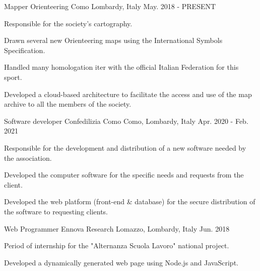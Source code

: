 

\begin{cventries}

  \cventry
  {Mapper} %
  {Orienteering Como} %
  {Lombardy, Italy} %
  {May. 2018 - PRESENT} %
  {
    \begin{cvitems} %
      \item {Responsible for the society's cartography.}
      \item {Drawn several new Orienteering maps using the International Symbols Specification.}
      \item {Handled many homologation iter with the official Italian Federation for this sport.}
      \item {Developed a cloud-based architecture to facilitate the access and use of the map archive to all the members of the society.}
    \end{cvitems}
  }

  \cventry
  {Software developer} %
  {Confedilizia Como} %
  {Como, Lombardy, Italy} %
  {Apr. 2020 - Feb. 2021} %
  {
    \begin{cvitems} %
      \item {Responsible for the development and distribution of a new software needed by the association.}
      \item {Developed the computer software for the specific needs and requests from the client.}
      \item {Developed the web platform (front-end \& database) for the secure distribution of the software to requesting clients.}
    \end{cvitems}
  }

  \cventry
  {Web Programmer} %
  {Ennova Research} %
  {Lomazzo, Lombardy, Italy} %
  {Jun. 2018} %
  {
    \begin{cvitems} %
      \item {Period of internship for the "Alternanza Scuola Lavoro" national project.}
      \item {Developed a dynamically generated web page using Node.js and JavaScript.}
    \end{cvitems}
  }
\end{cventries}
